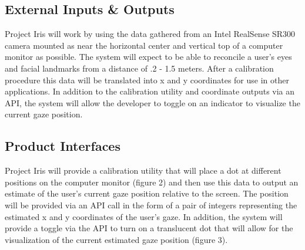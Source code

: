 \subsection{External Inputs \& Outputs}
Project Iris will work by using the data gathered from an Intel RealSense SR300 camera mounted as near the horizontal center and vertical top of a computer monitor as possible. The system will expect to be able to reconcile a user's eyes and facial landmarks from a distance of .2 - 1.5 meters. After a calibration procedure this data will be translated into x and y coordinates for use in other applications. In addition to the calibration utility and coordinate outputs via an API, the system will allow the developer to toggle on an indicator to visualize the current gaze position.

\subsection{Product Interfaces}
Project Iris will provide a calibration utility that will place a dot at different positions on the computer monitor (figure 2) and then use this data to output an estimate of the user's current gaze position relative to the screen. The position will be provided via an API call in the form of a pair of integers representing the estimated x and y coordinates of the user's gaze. In addition, the system will provide a toggle via the API to turn on a translucent dot that will allow for the visualization of the current estimated gaze position (figure 3).